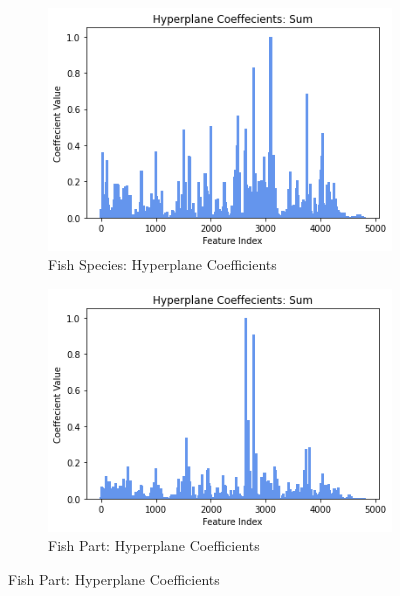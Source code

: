 \documentclass[runningheads]{llncs}
\begin{document}
\begin{figure}[htb]
  \centering  
  \caption[Two numerical solutions]{    
    Hyperplane coefficients $\beta_t$.
    }
  \begin{subfigure}[b]{.55\linewidth}
    \includegraphics[width=\linewidth]{fish_total_coefficients.png}
    \caption{Fish Species: Hyperplane Coefficients}\label{fig:fish-hyperplane-coeffcients}
  \end{subfigure}
  \begin{subfigure}[b]{.55\linewidth}
    \includegraphics[width=\linewidth]{part_total_coefficients.png}
    \caption{Fish Part: Hyperplane Coefficients}\label{fig:part-hyperplane-coeffcients}
  \end{subfigure}

  \label{fig:hyperplane-coefficients}
\end{figure} 
\end{document}
